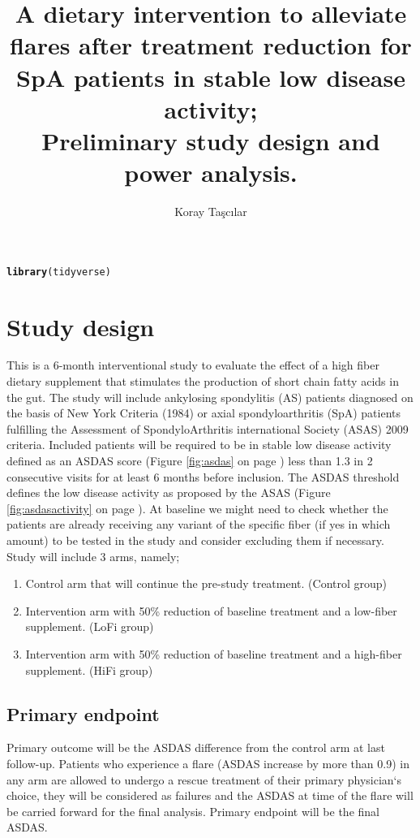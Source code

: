 \documentclass{article}\usepackage[]{graphicx}\usepackage[]{color}
\title{A dietary intervention to alleviate flares after treatment reduction for SpA patients in stable low disease activity;\\Preliminary study design and power analysis.}
\author{Koray Taşcılar}
\makeatletter
\newcommand{\hlstd}[1]{\textcolor[rgb]{0.345,0.345,0.345}{#1}}%
\newcommand{\hlkwd}[1]{\textcolor[rgb]{0.737,0.353,0.396}{\textbf{#1}}}%
\newenvironment{kframe}{%
 \def\at@end@of@kframe{}%
 \ifinner\ifhmode%
  \def\at@end@of@kframe{\end{minipage}}%
  \begin{minipage}{\columnwidth}%
 \fi\fi%
 \def\FrameCommand##1{\hskip\@totalleftmargin \hskip-\fboxsep
 \colorbox{shadecolor}{##1}\hskip-\fboxsep
     \hskip-\linewidth \hskip-\@totalleftmargin \hskip\columnwidth}%
 \MakeFramed {\advance\hsize-\width
   \@totalleftmargin\z@ \linewidth\hsize
   \@setminipage}}%
 {\par\unskip\endMakeFramed%
 \at@end@of@kframe}
\newenvironment{knitrout}{}{} %
\makeatother
\begin{document}
\maketitle

\begin{knitrout}
\color{fgcolor}\begin{kframe}
\begin{alltt}
\hlkwd{library}\hlstd{(tidyverse)}
\end{alltt}
\end{kframe}
\end{knitrout}

\section {Study design}
This is a 6-month interventional study to evaluate the effect of a high fiber dietary supplement that stimulates the production of short chain fatty acids in the gut. The study will include ankylosing spondylitis (AS) patients diagnosed on the basis of New York Criteria (1984) or axial spondyloarthritis (SpA) patients fulfilling the Assessment of SpondyloArthritis international Society (ASAS) 2009 criteria. Included patients will be required to be in stable low disease activity defined as an ASDAS score (Figure \ref{fig:asdas} on page \pageref{fig:asdas}) less than 1.3 in 2 consecutive visits for at least 6 months before inclusion. The ASDAS threshold defines the low disease activity as proposed by the  ASAS (Figure \ref{fig:asdasactivity} on page \pageref{fig:asdasactivity}). At baseline we might need to check whether the patients are already receiving any variant of the specific fiber (if yes in which amount) to be tested in the study and consider excluding them if necessary. Study will include 3 arms, namely;
\begin{enumerate}
  \item Control arm that will continue the pre-study treatment. (Control group)
  \item Intervention arm with 50\% reduction of baseline treatment and a low-fiber supplement. (LoFi group)
  \item Intervention arm with 50\% reduction of baseline treatment and a high-fiber supplement. (HiFi group)
\end{enumerate}
\subsection{Primary endpoint}
Primary outcome will be the ASDAS difference from the control arm at last follow-up.
Patients who experience a flare (ASDAS increase by more than 0.9) in any arm are allowed to undergo a rescue treatment of their primary physician‘s choice, they will be considered as failures and the ASDAS at time of the flare will be carried forward for the final analysis.
Primary endpoint will be the final ASDAS.
\end{document}
